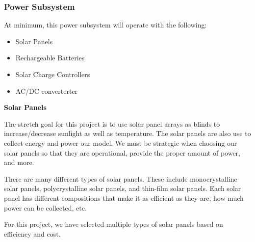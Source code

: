 \subsubsection{Power Subsystem}

\begin{flushleft} 
	At minimum, this power subsystem will operate with the following:
	\begin{itemize}
		\item Solar Panels 
		\item Rechargeable Batteries 
		\item Solar Charge Controllers
		\item AC/DC converterter
	\end{itemize}
	\textbf{Solar Panels}\par
	The stretch goal for this project is to use solar panel arrays as blinds to increase/decrease sunlight as well as temperature. The solar panels are also use to collect energy and power our model. We must be strategic when choosing our solar panels so that they are operational, provide the proper amount of power, and more. \par
	There are many different types of solar panels. These include monocrystalline solar panels, polycrystalline solar panels, and thin-film solar panels. Each solar panel has different compositions that make it as efficient as they are, how much power can be collected, etc. \par
	For this project, we have selected multiple types of solar panels based on efficiency and cost.
\end{flushleft}
